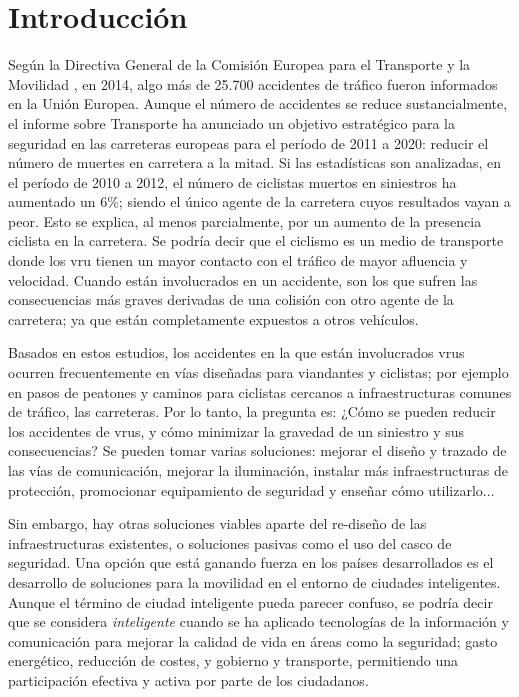 \chapter{Introducción}
Según la Directiva General de la Comisión Europea para el Transporte y la
Movilidad \cite{1}, en 2014, algo más de 25.700 accidentes de tráfico fueron
informados en la Unión Europea. Aunque el número de accidentes se reduce
sustancialmente, el informe sobre Transporte \cite{2} ha anunciado un objetivo
estratégico para la seguridad en las carreteras europeas para el período de
2011 a 2020: reducir el número de muertes en carretera a la mitad. Si las
estadísticas son analizadas, en el período de 2010 a 2012, el número de
ciclistas muertos en siniestros ha aumentado un 6\%; siendo el único agente
de la carretera cuyos resultados vayan a peor. Esto se explica, al menos
parcialmente, por un aumento de la presencia ciclista en la carretera. Se
podría decir que el ciclismo es un medio de transporte donde los \gls{vru}
tienen un mayor contacto con el tráfico de mayor afluencia y velocidad. Cuando
están involucrados en un accidente, son los que sufren las consecuencias más
graves derivadas de una colisión con otro agente de la carretera; ya que están
completamente expuestos a otros vehículos.

Basados en estos estudios, los accidentes en la que están involucrados
\gls{vru}s ocurren frecuentemente en vías diseñadas para viandantes y ciclistas;
por ejemplo en pasos de peatones y caminos para ciclistas cercanos a
infraestructuras comunes de tráfico, las carreteras. Por lo tanto, la pregunta
es: ¿Cómo se pueden reducir los accidentes de \gls{vru}s, y cómo minimizar la
gravedad de un siniestro y sus consecuencias? Se pueden tomar varias
soluciones: mejorar el diseño y trazado de las vías de comunicación, mejorar la
iluminación, instalar más infraestructuras de protección, promocionar
equipamiento de seguridad y enseñar cómo utilizarlo...

Sin embargo, hay otras soluciones viables aparte del re-diseño de las
infraestructuras existentes, o soluciones pasivas como el uso del casco de
seguridad. Una opción que está ganando fuerza en los países desarrollados es el
desarrollo de soluciones para la movilidad en el entorno de ciudades
inteligentes. Aunque el término de ciudad inteligente pueda parecer confuso,
se podría decir que se considera \emph{inteligente} cuando se ha aplicado
tecnologías de la información y comunicación para mejorar la calidad de vida en
áreas como la seguridad; gasto energético, reducción de costes, y gobierno y
transporte, permitiendo una participación efectiva y activa por parte de los
ciudadanos.

